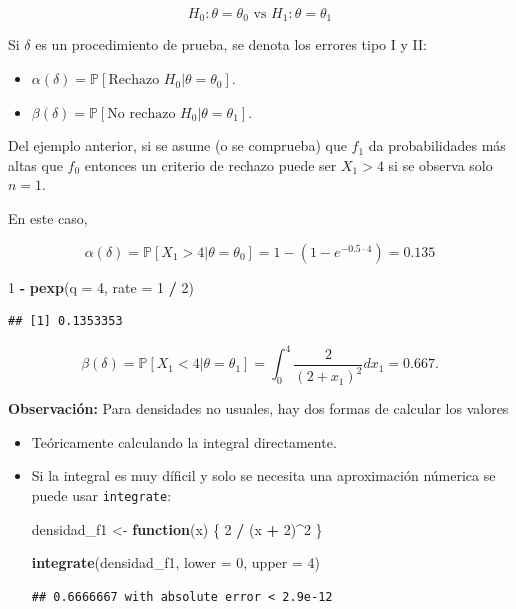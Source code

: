 \documentclass[
  12pt,
]{book}
\newenvironment{Shaded}{\begin{snugshade}}{\end{snugshade}}
\newcommand{\ControlFlowTok}[1]{\textcolor[rgb]{0.13,0.29,0.53}{\textbf{#1}}}
\newcommand{\DataTypeTok}[1]{\textcolor[rgb]{0.13,0.29,0.53}{#1}}
\newcommand{\DecValTok}[1]{\textcolor[rgb]{0.00,0.00,0.81}{#1}}
\newcommand{\KeywordTok}[1]{\textcolor[rgb]{0.13,0.29,0.53}{\textbf{#1}}}
\newcommand{\NormalTok}[1]{#1}
\newcommand{\OperatorTok}[1]{\textcolor[rgb]{0.81,0.36,0.00}{\textbf{#1}}}
\newcommand{\StringTok}[1]{\textcolor[rgb]{0.31,0.60,0.02}{#1}}
\begin{document}
\[H_0: \theta=\theta_0 \text{ vs } H_1:\theta=\theta_1\]

Si \(\delta\) es un procedimiento de prueba, se denota los errores tipo I y II:

\begin{itemize}
\item
  \(\alpha(\delta) = \mathbb P[\text{Rechazo }H_0|\theta=\theta_0 ]\).
\item
  \(\beta(\delta) = \mathbb P[\text{No rechazo }H_0|\theta=\theta_1 ]\).
\end{itemize}

Del ejemplo anterior, si se asume (o se comprueba) que \(f_1\) da probabilidades
más altas que \(f_0\) entonces un criterio de rechazo puede ser \(X_1>4\) si se
observa solo \(n=1\).

En este caso,

\[\alpha(\delta) = \mathbb P[X_1>4|\theta=\theta_0] = 1-(1-e^{-0.5\cdot 4}) =
  0.135\]

\begin{Shaded}
\begin{Highlighting}[]
\DecValTok{1} \OperatorTok{{-}}\StringTok{ }\KeywordTok{pexp}\NormalTok{(}\DataTypeTok{q =} \DecValTok{4}\NormalTok{, }\DataTypeTok{rate =} \DecValTok{1} \OperatorTok{/}\StringTok{ }\DecValTok{2}\NormalTok{)}
\end{Highlighting}
\end{Shaded}

\begin{verbatim}
## [1] 0.1353353
\end{verbatim}

\[\beta(\delta) = \mathbb P[X_1<4|\theta=\theta_1] = \int_{0}^{4}\dfrac2{(2+x_1)^2}dx_1=0.667.\]

\textbf{Observación:} Para densidades no usuales, hay dos formas de calcular los
valores

\begin{itemize}
\item
  Teóricamente calculando la integral directamente.
\item
  Si la integral es muy díficil y solo se necesita una aproximación númerica se
  puede usar \texttt{integrate}:

\begin{Shaded}
\begin{Highlighting}[]
\NormalTok{densidad\_f1 \textless{}{-}}\StringTok{ }\ControlFlowTok{function}\NormalTok{(x) \{}
  \DecValTok{2} \OperatorTok{/}\StringTok{ }\NormalTok{(x }\OperatorTok{+}\StringTok{ }\DecValTok{2}\NormalTok{)}\OperatorTok{\^{}}\DecValTok{2}
\NormalTok{\}}

\KeywordTok{integrate}\NormalTok{(densidad\_f1, }\DataTypeTok{lower =} \DecValTok{0}\NormalTok{, }\DataTypeTok{upper =} \DecValTok{4}\NormalTok{)}
\end{Highlighting}
\end{Shaded}

\begin{verbatim}
## 0.6666667 with absolute error < 2.9e-12
\end{verbatim}
\end{itemize}
\end{document}
